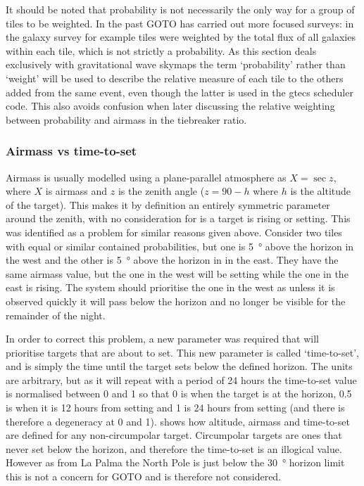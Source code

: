 \begin{colsection}
\begin{colsection}
It should be noted that probability is not necessarily the only way for a group of tiles to be weighted. In the past GOTO has carried out more focused surveys: in the galaxy survey for example tiles were weighted by the total flux of all galaxies within each tile, which is not strictly a probability. As this section deals exclusively with gravitational wave skymaps the term `probability' rather than `weight' will be used to describe the relative measure of each tile to the others added from the same event, even though the latter is used in the \gls{gtecs} scheduler code. This also avoids confusion when later discussing the relative weighting between probability and airmass in the tiebreaker ratio.

\subsubsection{Airmass vs time-to-set}

Airmass is usually modelled using a plane-parallel atmosphere as $X=\sec{z}$, where $X$ is airmass and $z$ is the zenith angle ($z=90-h$ where $h$ is the altitude of the target). This makes it by definition an entirely symmetric parameter around the zenith, with no consideration for is a target is rising or setting. This was identified as a problem for similar reasons given above. Consider two tiles with equal or similar contained probabilities, but one is \SI{5}{\degree} above the horizon in the west and the other is \SI{5}{\degree} above the horizon in in the east. They have the same airmass value, but the one in the west will be setting while the one in the east is rising. The system should prioritise the one in the west as unless it is observed quickly it will pass below the horizon and no longer be visible for the remainder of the night.

In order to correct this problem, a new parameter was required that will prioritise targets that are about to set. This new parameter is called `time-to-set', and is simply the time until the target sets below the defined horizon. The units are arbitrary, but as it will repeat with a period of 24 hours the time-to-set value is normalised between 0 and 1 so that 0 is when the target is at the horizon, 0.5 is when it is 12 hours from setting and 1 is 24 hours from setting (and there is therefore a degeneracy at 0 and 1).  shows how altitude, airmass and time-to-set are defined for any non-circumpolar target. Circumpolar targets are ones that never set below the horizon, and therefore the time-to-set is an illogical value. However as from La Palma the North Pole is just below the \SI{30}{\degree} horizon limit this is not a concern for GOTO and is therefore not considered.


\end{colsection}
\end{colsection}
